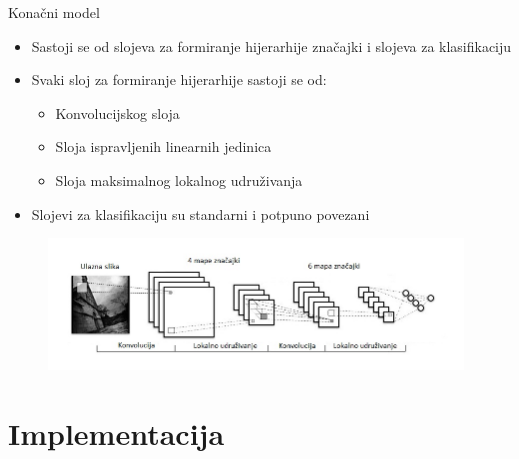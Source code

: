 \documentclass[pdf]{beamer}
\begin{document}
\begin{frame}{Konačni model}

\begin{itemize}
\setlength\itemsep{0.5em}

	\item Sastoji se od slojeva za formiranje hijerarhije značajki i slojeva za klasifikaciju

	\item Svaki sloj za formiranje hijerarhije sastoji se od:
	\begin{itemize}
		\item  Konvolucijskog sloja 
		\item Sloja ispravljenih linearnih jedinica
 		\item  Sloja maksimalnog lokalnog udruživanja
 	\end{itemize}
 	
 	\item Slojevi za klasifikaciju su standarni i potpuno povezani
 
\end{itemize} 

\begin{figure}[ht!]
\centering
\includegraphics[width=11cm]{slike/convnet.jpg}
\end{figure}

\end{frame}

\section{Implementacija}
\end{document}
